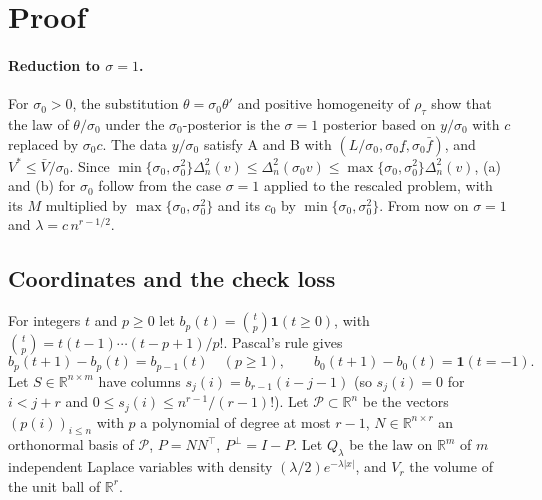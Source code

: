 \documentclass[11pt]{article}
\theoremstyle{definition}
\theoremstyle{remark}
\newcommand{\R}{\mathbb{R}}
\newcommand{\Ql}{Q_\lambda}
\newcommand{\Pp}{P^{\perp}}
\newcommand{\cP}{\mathcal P}
\newcommand{\fl}{\underline f}
\newcommand{\fu}{\bar f}
\newcommand{\Vb}{\bar V}
\newcommand{\ind}{\mathbf 1}
\begin{document}
\section{Proof}

\paragraph{Reduction to $\sigma=1$.} For $\sigma_0>0$, the substitution $\theta=\sigma_0\theta'$ and positive homogeneity of $\rho_\tau$ show that the law of $\theta/\sigma_0$ under the $\sigma_0$-posterior is the $\sigma=1$ posterior based on $y/\sigma_0$ with $c$ replaced by $\sigma_0c$. The data $y/\sigma_0$ satisfy A and B with $(L/\sigma_0,\sigma_0\fl,\sigma_0\fu)$, and $V^{*}\le\Vb/\sigma_0$. Since $\min\{\sigma_0,\sigma_0^2\}\Delta_n^2(v)\le\Delta_n^2(\sigma_0v)\le\max\{\sigma_0,\sigma_0^2\}\Delta_n^2(v)$, (a) and (b) for $\sigma_0$ follow from the case $\sigma=1$ applied to the rescaled problem, with its $M$ multiplied by $\max\{\sigma_0,\sigma_0^2\}$ and its $c_0$ by $\min\{\sigma_0,\sigma_0^2\}$. From now on $\sigma=1$ and $\lambda=c\,n^{r-1/2}$.

\subsection{Coordinates and the check loss}

For integers $t$ and $p\ge0$ let $b_p(t)=\binom tp\ind(t\ge0)$, with $\binom tp=t(t-1)\cdots(t-p+1)/p!$. Pascal's rule gives
\begin{equation}\label{eq:pascal}
b_p(t+1)-b_p(t)=b_{p-1}(t)\quad(p\ge1),\qquad b_0(t+1)-b_0(t)=\ind(t=-1).
\end{equation}
Let $S\in\R^{n\times m}$ have columns $s_j(i)=b_{r-1}(i-j-1)$ (so $s_j(i)=0$ for $i<j+r$ and $0\le s_j(i)\le n^{r-1}/(r-1)!$). Let $\cP\subset\R^n$ be the vectors $(p(i))_{i\le n}$ with $p$ a polynomial of degree at most $r-1$, $N\in\R^{n\times r}$ an orthonormal basis of $\cP$, $P=NN^\top$, $\Pp=I-P$. Let $\Ql$ be the law on $\R^m$ of $m$ independent Laplace variables with density $(\lambda/2)e^{-\lambda|x|}$, and $V_r$ the volume of the unit ball of $\R^r$.
\end{document}
